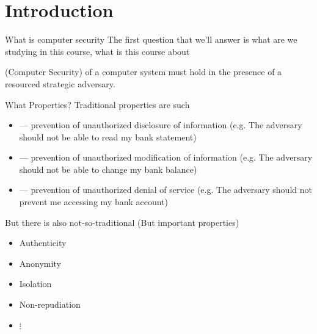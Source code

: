 \chapter{Introduction}%
\label{cha:Introduction}
\begin{parag}{What is computer security}
    The first question that we'll answer is what are we studying in this course, what is this course about 
	\begin{definition}{(Computer Security)}
		 of a computer system must hold in the presence of a resourced strategic adversary.
	\end{definition}
\end{parag}
\begin{parag}{What Properties?}
    Traditional properties are such 
	\begin{itemize}
	    \item {} --- prevention of unauthorized disclosure of information (e.g. The adversary should not be able to read my bank statement)
	    \item {} --- prevention of unauthorized modification of information (e.g. The adversary should not be able to change my bank balance)
	    \item {} --- prevention of unauthorized denial of service (e.g. The adversary should not prevent me accessing my bank account)
	\end{itemize}
	But there is also not-so-traditional (But important properties)
	\begin{itemize}
	    \item Authenticity
	    \item Anonymity
	    \item Isolation
	    \item Non-repudiation
	    \item $\vdots$
	\end{itemize}
\end{parag}

